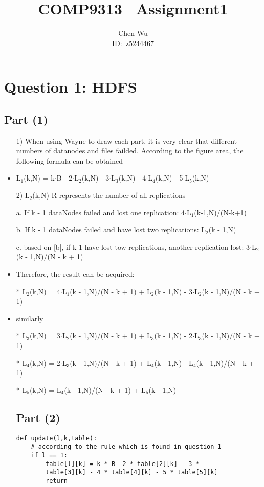 \documentclass{article}
\begin{document}
\title{	COMP9313 \ Assignment1}
\author{ Chen Wu\\ ID:\ z5244467}

\maketitle %
\section*{Question 1: HDFS}
\subsection*{Part (1)}
\begin{itemize}
\item [1)] When using Wayne to draw each part, it is very clear that different numbers of datanodes and files failded. According to the figure area, the following formula can be obtained
\item L$_{1}$(k,N) = k$\cdot$B - 2$\cdot$L$_{2}$(k,N) - 3$\cdot$L$_{3}$(k,N) - 4$\cdot$L$_{4}$(k,N) - 5$\cdot$L$_{5}$(k,N)

\item [2)] L$_{2}$(k,N) 
R represents the number of all replications
\item [a.]If k - 1 dataNodes failed and lost one replication: 4$\cdot$L$_{1}$(k-1,N)/(N-k+1)
\item [b.] If k - 1 dataNodes failed and have lost two replications:  L$_{2}$(k - 1,N)
\item [c.] based on [b], if k-1 have lost tow replications, another replication lost: 3$\cdot$L$_{2}$(k - 1,N)/(N - k + 1)
\item Therefore, the result can be acquired:
\item [*] L$_{2}$(k,N) = 4$\cdot$L$_{1}$(k - 1,N)/(N - k + 1) + L$_{2}$(k - 1,N) - 3$\cdot$L$_{2}$(k - 1,N)/(N - k + 1)
\item similarly 
\item [*] L$_{3}$(k,N) = 3$\cdot$L$_{2}$(k - 1,N)/(N - k + 1) + L$_{3}$(k - 1,N) - 2$\cdot$L$_{3}$(k - 1,N)/(N - k + 1)
\item [*] L$_{4}$(k,N) = 2$\cdot$L$_{3}$(k - 1,N)/(N - k + 1) + L$_{4}$(k - 1,N) - L$_{4}$(k - 1,N)/(N - k + 1)
\item [*] L$_{5}$(k,N) = L$_{4}$(k - 1,N)/(N - k + 1) + L$_{5}$(k - 1,N)

\subsection*{Part (2)}
\lstset{language=python}
\begin{lstlisting}
def update(l,k,table):
    # according to the rule which is found in question 1
	if l == 1:
		table[l][k] = k * B -2 * table[2][k] - 3 *
		table[3][k] - 4 * table[4][k] - 5 * table[5][k]
		return
	

\end{lstlisting}
\end{itemize}
\end{document}
